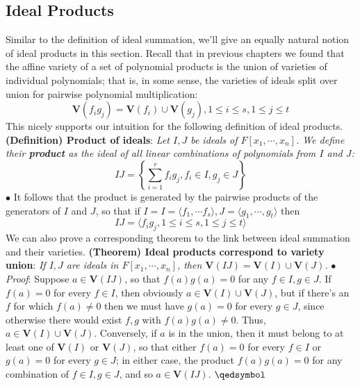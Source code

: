 \documentclass{article}
\newcommand*{\tb}{\textbf}
\newcommand*{\ti}{\textit}
\newcommand*{\n}{\newline}
\newcommand*{\nn}{\newline \newline}
\newcommand*{\Fx}{\ensuremath{F[x_1, \cdots, x_n]}}
\newcommand*{\gt}{g_1, \cdots, g_t}
\newcommand*{\V}{\ensuremath{\mathbf{V}}}
\begin{document}
\subsection{Ideal Products}
Similar to the definition of ideal summation, we'll give an equally natural notion of ideal products in this section. Recall that in previous chapters we found that the affine variety of a set of polynomial products is the union of varieties of individual polynomials; that is, in some sense, the varieties of ideals split over union for pairwise polynomial multiplication:
$$ \V(f_i g_j) = \V(f_i) \cup \V(g_j), 1 \leq i \leq s, 1 \leq j \leq t $$
This nicely supports our intuition for the following definition of ideal products.
\nn
\tb{(Definition) Product of ideals}: \ti{Let $ I, J $ be ideals of $ \Fx $. We define their \tb{product} as the ideal of all linear combinations of polynomials from $ I $ and $ J $:}
$$ I J = \left \{ \sum_{i = 1}^r f_i g_j, f_i \in I, g_j \in J \right \} $$
\indent $ \bullet $ It follows that the product is generated by the pairwise products of the generators of $ I $ and $ J $, so that if $ I = I = \langle f_1, \cdots f_s \rangle, J = \langle \gt \rangle $ then
$$ I J = \langle f_i g_j, 1 \leq i \leq s, 1 \leq j \leq t \rangle $$
We can also prove a corresponding theorem to the link between ideal summation and their varieties.
\nn
\tb{(Theorem) Ideal products correspond to variety union}: \ti{If $ I, J $ are ideals in $ \Fx $, then $ \V(I J) = \V(I) \cup \V(J) $.}
\n
\indent $ \bullet $ \ti{Proof}: Suppose $ a \in \V(I J) $, so that $ f(a) g(a) = 0 $ for any $ f \in I, g \in J $. If $ f(a) = 0 $ for every $ f \in I $, then obviously $ a \in \V(I) \cup \V(J) $, but if there's an $ f $ for which $ f(a) \neq 0 $ then we must have $ g(a) = 0 $ for every $ g \in J $, since otherwise there would exist $ f, g $ with $ f(a) g(a) \neq 0 $. Thus, $ a \in \V( I) \cup \V(J) $. Conversely, if $ a $ is in the union, then it must belong to at least one of $ \V(I) $ or $ \V(J) $, so that either $ f(a) = 0 $ for every $ f \in I $ or $ g(a) = 0 $ for every $ g \in J $; in either case, the product $ f(a) g(a) = 0 $ for any combination of $ f \in I, g \in J $, and so $ a \in \V(I J) $. $ \qedsymbol $
\end{document}
